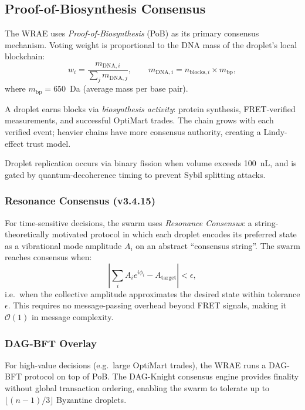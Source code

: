 \documentclass[12pt,a4paper]{article}
\begin{document}
\subsection{Proof-of-Biosynthesis Consensus}

The WRAE uses \emph{Proof-of-Biosynthesis} (PoB) as its primary consensus
mechanism.  Voting weight is proportional to the DNA mass of the droplet's
local blockchain:
\begin{equation}
w_i = \frac{m_{\mathrm{DNA},i}}{\sum_j m_{\mathrm{DNA},j}},
\qquad m_{\mathrm{DNA},i} = n_{\mathrm{blocks},i} \times m_\mathrm{bp},
\label{eq:pob-weight}
\end{equation}
where $m_\mathrm{bp} = 650$~Da (average mass per base pair).

A droplet earns blocks via \emph{biosynthesis activity}: protein synthesis,
FRET-verified measurements, and successful OptiMart trades.  The chain
grows with each verified event; heavier chains have more consensus authority,
creating a Lindy-effect trust model.

Droplet replication occurs via binary fission when volume exceeds
100~nL, and is gated by quantum-decoherence timing to prevent
Sybil splitting attacks.

\subsubsection{Resonance Consensus (v3.4.15)}

For time-sensitive decisions, the swarm uses \emph{Resonance Consensus}: a
string-theoretically motivated protocol in which each droplet encodes its
preferred state as a vibrational mode amplitude $A_i$ on an abstract
``consensus string''.  The swarm reaches consensus when:
\begin{equation}
\left|\sum_i A_i e^{i\phi_i} - A_\mathrm{target}\right| < \epsilon,
\label{eq:resonance-consensus}
\end{equation}
i.e.\ when the collective amplitude approximates the desired state within
tolerance $\epsilon$.  This requires no message-passing overhead beyond FRET
signals, making it $\mathcal{O}(1)$ in message complexity.

\subsubsection{DAG-BFT Overlay}

For high-value decisions (e.g.\ large OptiMart trades), the WRAE runs a
DAG-BFT protocol on top of PoB.  The DAG-Knight consensus engine
\citep{qnk2026} provides finality without global transaction ordering,
enabling the swarm to tolerate up to $\lfloor(n-1)/3\rfloor$ Byzantine
droplets.
\end{document}
